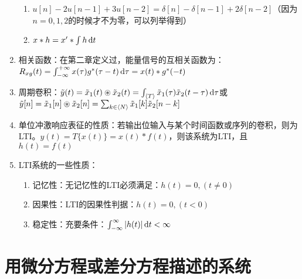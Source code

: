 \documentclass{article}
\begin{document}
\begin{enumerate}[label=(\arabic*)]
				\begin{enumerate}[label=(\roman*)]
					\item $u[n]-2u[n-1]+3u[n-2]=\delta[n]-\delta[n-1]+2\delta[n-2]$（因为$n=0,1,2$的时候才不为零，可以列举得到）
					\item $x*h=x'*\int h\mathop{}\!\mathrm{d} t$
				\end{enumerate}
	\item 相关函数：在第二章定义过，能量信号的互相关函数为：\\
				$R_{xg}(t) = \int_{-\infty}^{+\infty}x(\tau)g^*(\tau-t)\mathop{}\!\mathrm{d}\tau = x(t)*g^*(-t)$
	\item 周期卷积：$\tilde{y}(t)=\tilde{x}_1(t)\circledast\tilde{x}_2(t)=\int_{\langle T\rangle}\tilde{x}_1(\tau)\tilde{x}_2(t-\tau)\mathop{}\!\mathrm{d}\tau$或\\
				$\tilde{y}[n]=\tilde{x}_1[n]\circledast\tilde{x}_2[n]=\sum_{k\in\langle N\rangle}\tilde{x}_1[k]\tilde{x}_2[n-k]$
	\item 单位冲激响应表征的性质：若输出位输入与某个时间函数或序列的卷积，则为LTI。$y(t)=T\{x(t)\}=x(t)*f(t)$，则该系统为LTI，且$h(t)=f(t)$
	\item LTI系统的一些性质：
				\begin{enumerate}[label=(\roman*)]
					\item 记忆性：无记忆性的LTI必须满足：$h(t)=0,(t\neq 0)$
					\item 因果性：LTI的因果性判据：$h(t)=0,(t<0)$
					\item 稳定性：充要条件：$\int_{-\infty}^{\infty}|h(t)|\mathop{}\!\mathrm{d} t<\infty$
				\end{enumerate}
\end{enumerate}

\section{用微分方程或差分方程描述的系统}
\end{document}
